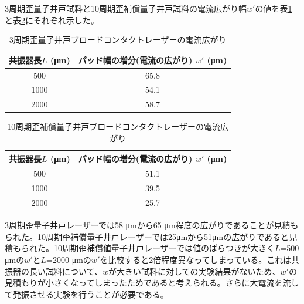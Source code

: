 3周期歪量子井戸試料と10周期歪補償量子井戸試料の電流広がり幅$w'$の値を表\ref{table:table_3QW_broadcontact_w_eff}と表\ref{table:table_10QW_broadcontact_w_eff}にそれぞれ示した。
\begin{table}[h]
  \caption{3周期歪量子井戸ブロードコンタクトレーザーの電流広がり}
  \label{table:table_3QW_broadcontact_w_eff}
  \centering
  \begin{tabular}{cc}
    \hline
    共振器長$L$ (\si{\micro\metre})  & パッド幅の増分(電流の広がり) $w'$ (\si{\micro\metre})   \\
    \hline \hline
     500 & 65.8  \\
    1000  & 54.1 \\
    2000  & 58.7 \\ 
    \hline
  \end{tabular}
\end{table}

\begin{table}[h]
  \caption{10周期歪補償量子井戸ブロードコンタクトレーザーの電流広がり}
  \label{table:table_10QW_broadcontact_w_eff}
  \centering
  \begin{tabular}{cc}
    \hline
    共振器長$L$ (\si{\micro\metre})  & パッド幅の増分(電流の広がり) $w'$ (\si{\micro\metre})   \\
    \hline \hline
     500 & 51.1  \\
    1000  & 39.5 \\
    2000  & 25.7 \\ 
    \hline
  \end{tabular}
\end{table}

3周期歪量子井戸レーザーでは58 \si{\micro\metre}から65 \si{\micro\metre}程度の広がりであることが見積もられた。10周期歪補償量子井戸レーザーでは25\si{ \micro\metre}から51\si{ \micro\metre}の広がりであると見積もられた。10周期歪補償値量子井戸レーザーでは値のばらつきが大きく$L$=500 \si{\micro\metre}の$w'$と$L$=2000 \si{\micro\metre}の$w'$を比較すると2倍程度異なってしまっている。これは共振器の長い試料について、$w$が大きい試料に対しての実験結果がないため、$w'$の見積もりが小さくなってしまったためであると考えられる。さらに大電流を流して発振させる実験を行うことが必要である。


